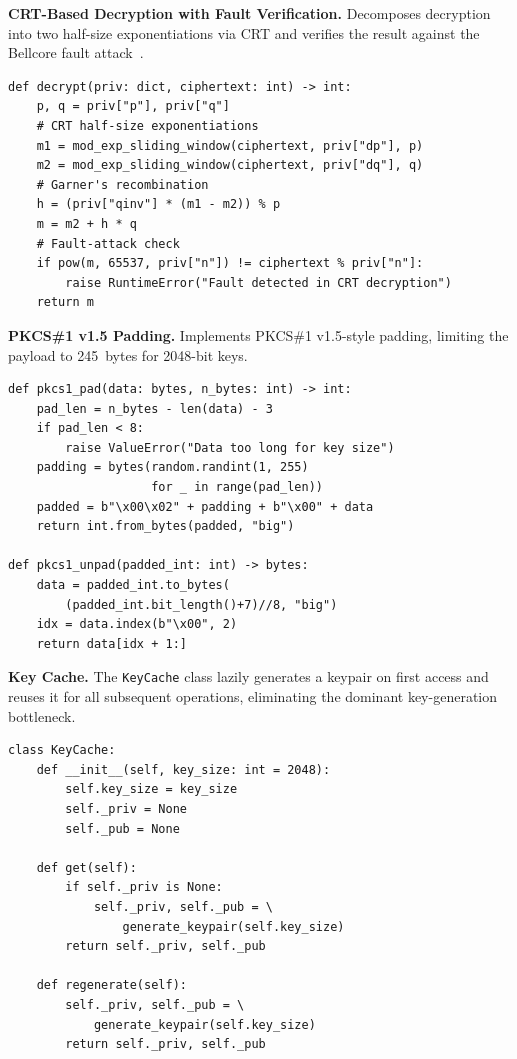 \documentclass[journal]{IEEEtran}
\begin{document}
\textbf{CRT-Based Decryption with Fault Verification.}
Decomposes decryption into two half-size exponentiations via CRT and verifies the result against the Bellcore fault attack~\cite{boneh2001}.

\begin{lstlisting}
def decrypt(priv: dict, ciphertext: int) -> int:
    p, q = priv["p"], priv["q"]
    # CRT half-size exponentiations
    m1 = mod_exp_sliding_window(ciphertext, priv["dp"], p)
    m2 = mod_exp_sliding_window(ciphertext, priv["dq"], q)
    # Garner's recombination
    h = (priv["qinv"] * (m1 - m2)) % p
    m = m2 + h * q
    # Fault-attack check
    if pow(m, 65537, priv["n"]) != ciphertext % priv["n"]:
        raise RuntimeError("Fault detected in CRT decryption")
    return m
\end{lstlisting}
\vspace{-2mm}
\label{lst:decrypt}

\textbf{PKCS\#1 v1.5 Padding.}
Implements PKCS\#1 v1.5-style padding, limiting the payload to 245~bytes for 2048-bit keys.

\begin{lstlisting}
def pkcs1_pad(data: bytes, n_bytes: int) -> int:
    pad_len = n_bytes - len(data) - 3
    if pad_len < 8:
        raise ValueError("Data too long for key size")
    padding = bytes(random.randint(1, 255)
                    for _ in range(pad_len))
    padded = b"\x00\x02" + padding + b"\x00" + data
    return int.from_bytes(padded, "big")

def pkcs1_unpad(padded_int: int) -> bytes:
    data = padded_int.to_bytes(
        (padded_int.bit_length()+7)//8, "big")
    idx = data.index(b"\x00", 2)
    return data[idx + 1:]
\end{lstlisting}
\vspace{-2mm}
\label{lst:padding}

\textbf{Key Cache.}
The \texttt{KeyCache} class lazily generates a keypair on first access and reuses it for all subsequent operations, eliminating the dominant key-generation bottleneck.

\begin{lstlisting}
class KeyCache:
    def __init__(self, key_size: int = 2048):
        self.key_size = key_size
        self._priv = None
        self._pub = None

    def get(self):
        if self._priv is None:
            self._priv, self._pub = \
                generate_keypair(self.key_size)
        return self._priv, self._pub

    def regenerate(self):
        self._priv, self._pub = \
            generate_keypair(self.key_size)
        return self._priv, self._pub
\end{lstlisting}
\vspace{-2mm}
\label{lst:keycache}
\end{document}
